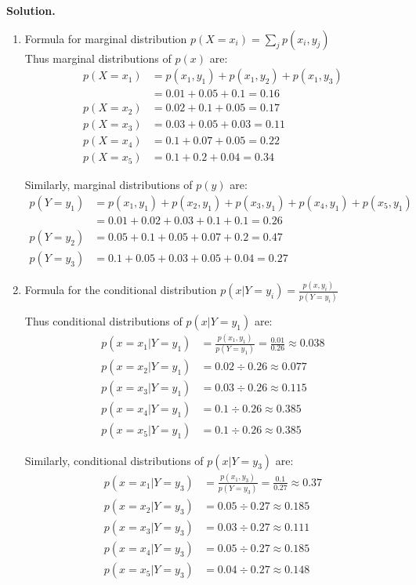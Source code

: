 \documentclass[a4paper, 12pt]{article}  %
\begin{document}
\textbf{Solution.}
\begin{enumerate}[label=(\alph*)]
    \item Formula for marginal distribution \( \displaystyle p(X = x_i) = \sum_j p(x_i, y_j)\) \\
    Thus marginal distributions of $p(x)$ are:
    \begin{align*}
    p(X = x_1) & = p(x_1, y_1) + p(x_1, y_2) + p(x_1, y_3)\\
    & = 0.01 + 0.05 + 0.1 = 0.16 \\
    p(X = x_2) &= 0.02 + 0.1 + 0.05 = 0.17 \\
    p(X = x_3) &= 0.03 + 0.05 + 0.03 = 0.11 \\
    p(X = x_4) &= 0.1 + 0.07 + 0.05 = 0.22 \\
    p(X = x_5) &= 0.1 + 0.2 + 0.04 = 0.34
    \end{align*}
    
    Similarly, marginal distributions of $p(y)$ are:
    \begin{align*}
    p(Y = y_1) &= p(x_1, y_1) + p(x_2, y_1) + p(x_3, y_1) + p(x_4, y_1) + p(x_5, y_1)\\
    & = 0.01 + 0.02 + 0.03 + 0.1 + 0.1 = 0.26 \\
    p(Y = y_2) &= 0.05 + 0.1 + 0.05 + 0.07 + 0.2 = 0.47 \\
    p(Y = y_3) &= 0.1 + 0.05 + 0.03 + 0.05 + 0.04 = 0.27
    \end{align*}
    \item Formula for the conditional distribution 
    $ \displaystyle p(x|Y = y_i) = \frac{p(x, y_i)}{p(Y = y_i)}$ 
    
    Thus conditional distributions of $p(x|Y=y_1)$ are:
    \begin{align*}
         p(x = x_1|Y = y_1) &= \frac{p(x_1, y_1)}{p(Y = y_1)} = \frac{0.01}{0.26} \approx 0.038 \\
         p(x = x_2|Y = y_1) &= 0.02 \div 0.26 \approx 0.077 \\
         p(x = x_3|Y = y_1) &= 0.03 \div 0.26 \approx 0.115 \\
         p(x = x_4|Y = y_1) &= 0.1 \div 0.26 \approx 0.385 \\
         p(x = x_5|Y = y_1) &= 0.1 \div 0.26 \approx 0.385
    \end{align*}
    
    Similarly, conditional distributions of $p(x|Y=y_3)$ are:
        \begin{align*}
         p(x = x_1|Y = y_3) &= \frac{p(x_1, y_3)}{p(Y = y_3)} = \frac{0.1}{0.27} \approx 0.37 \\
         p(x = x_2|Y = y_3) &= 0.05 \div 0.27 \approx 0.185 \\
         p(x = x_3|Y = y_3) &= 0.03 \div 0.27 \approx 0.111 \\
         p(x = x_4|Y = y_3) &= 0.05 \div 0.27 \approx 0.185 \\
         p(x = x_5|Y = y_3) &= 0.04 \div 0.27 \approx 0.148
    \end{align*}
\end{enumerate}
\end{document}
